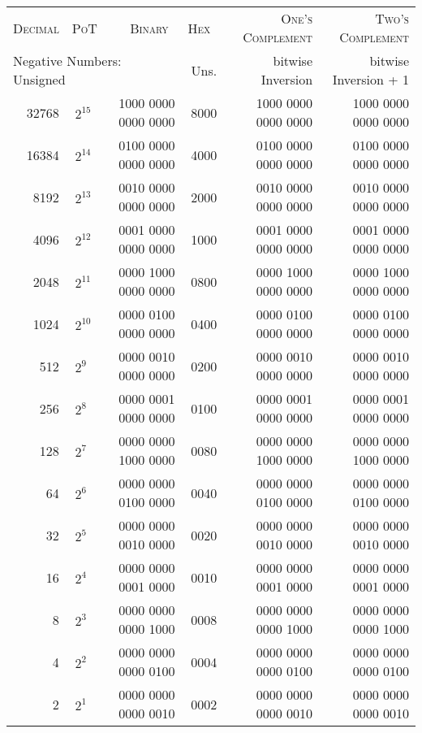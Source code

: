 \documentclass[a4paper,10pt]{article}
\begin{document}
\begin{center}\ttfamily
\begin{tabular}{rlrrrr}
    \toprule
    \scshape Decimal          &
    \scshape PoT              &
    \scshape Binary~          &
    \scshape Hex~             &
    \scshape One's Complement &
    \scshape Two's Complement \\

    \multicolumn{3}{l}{Negative Numbers: \hfill Unsigned}&
    Uns.&
    bitwise Inversion &
    bitwise Inversion + 1\\
    \midrule
    32768 &$ ~2^{15}     $& 1000 0000 0000 0000 & 8000 & 1000 0000 0000 0000 & 1000 0000 0000 0000 \\
    16384 &$ ~2^{14}     $& 0100 0000 0000 0000 & 4000 & 0100 0000 0000 0000 & 0100 0000 0000 0000 \\
     8192 &$ ~2^{13}     $& 0010 0000 0000 0000 & 2000 & 0010 0000 0000 0000 & 0010 0000 0000 0000 \\
     4096 &$ ~2^{12}     $& 0001 0000 0000 0000 & 1000 & 0001 0000 0000 0000 & 0001 0000 0000 0000 \\
     2048 &$ ~2^{11}     $& 0000 1000 0000 0000 & 0800 & 0000 1000 0000 0000 & 0000 1000 0000 0000 \\
     1024 &$ ~2^{10}     $& 0000 0100 0000 0000 & 0400 & 0000 0100 0000 0000 & 0000 0100 0000 0000 \\
      512 &$ ~2^{9~}     $& 0000 0010 0000 0000 & 0200 & 0000 0010 0000 0000 & 0000 0010 0000 0000 \\
      256 &$ ~2^{8~}     $& 0000 0001 0000 0000 & 0100 & 0000 0001 0000 0000 & 0000 0001 0000 0000 \\
      128 &$ ~2^{7~}     $& 0000 0000 1000 0000 & 0080 & 0000 0000 1000 0000 & 0000 0000 1000 0000 \\
       64 &$ ~2^{6~}     $& 0000 0000 0100 0000 & 0040 & 0000 0000 0100 0000 & 0000 0000 0100 0000 \\
       32 &$ ~2^{5~}     $& 0000 0000 0010 0000 & 0020 & 0000 0000 0010 0000 & 0000 0000 0010 0000 \\
       16 &$ ~2^{4~}     $& 0000 0000 0001 0000 & 0010 & 0000 0000 0001 0000 & 0000 0000 0001 0000 \\
        8 &$ ~2^{3~}     $& 0000 0000 0000 1000 & 0008 & 0000 0000 0000 1000 & 0000 0000 0000 1000 \\
        4 &$ ~2^{2~}     $& 0000 0000 0000 0100 & 0004 & 0000 0000 0000 0100 & 0000 0000 0000 0100 \\
        2 &$ ~2^{1~}     $& 0000 0000 0000 0010 & 0002 & 0000 0000 0000 0010 & 0000 0000 0000 0010 \\

\end{tabular}
\end{center}
\end{document}
